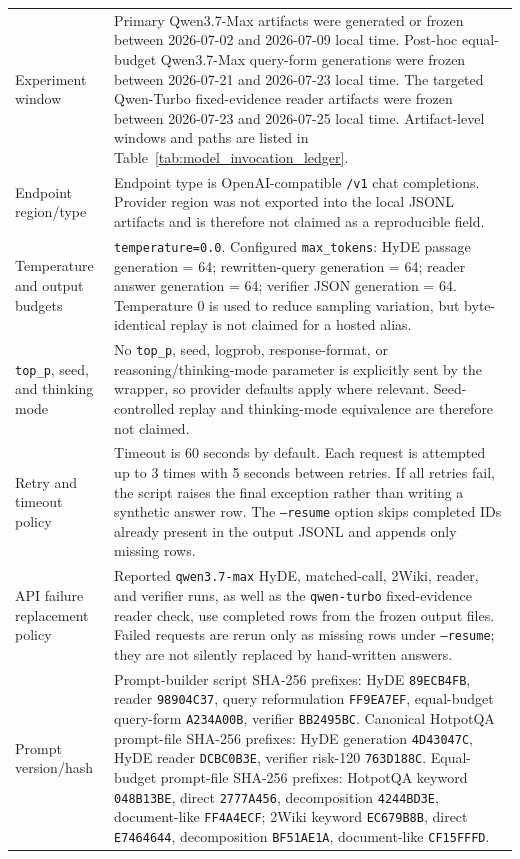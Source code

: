 \begin{longtable}{>{\raggedright\arraybackslash}p{}
                            >{\raggedright\arraybackslash}p{}}
Experiment window & Primary Qwen3.7-Max artifacts were generated or frozen between 2026-07-02 and 2026-07-09 local time. Post-hoc equal-budget Qwen3.7-Max query-form generations were frozen between 2026-07-21 and 2026-07-23 local time. The targeted Qwen-Turbo fixed-evidence reader artifacts were frozen between 2026-07-23 and 2026-07-25 local time. Artifact-level windows and paths are listed in Table~\ref{tab:model_invocation_ledger}. \\
Endpoint region/type & Endpoint type is OpenAI-compatible \texttt{/v1} chat completions. Provider region was not exported into the local JSONL artifacts and is therefore not claimed as a reproducible field. \\
Temperature and output budgets & \texttt{temperature=0.0}. Configured \texttt{max\_tokens}: HyDE passage generation = 64; rewritten-query generation = 64; reader answer generation = 64; verifier JSON generation = 64. Temperature 0 is used to reduce sampling variation, but byte-identical replay is not claimed for a hosted alias. \\
\texttt{top\_p}, seed, and thinking mode & No \texttt{top\_p}, seed, logprob, response-format, or reasoning/thinking-mode parameter is explicitly sent by the wrapper, so provider defaults apply where relevant. Seed-controlled replay and thinking-mode equivalence are therefore not claimed. \\
Retry and timeout policy & Timeout is 60 seconds by default. Each request is attempted up to 3 times with 5 seconds between retries. If all retries fail, the script raises the final exception rather than writing a synthetic answer row. The \texttt{--resume} option skips completed IDs already present in the output JSONL and appends only missing rows. \\
API failure replacement policy & Reported \texttt{qwen3.7-max} HyDE, matched-call, 2Wiki, reader, and verifier runs, as well as the \texttt{qwen-turbo} fixed-evidence reader check, use completed rows from the frozen output files. Failed requests are rerun only as missing rows under \texttt{--resume}; they are not silently replaced by hand-written answers. \\
Prompt version/hash & Prompt-builder script SHA-256 prefixes: HyDE \texttt{89ECB4FB}, reader \texttt{98904C37}, query reformulation \texttt{FF9EA7EF}, equal-budget query-form \texttt{A234A00B}, verifier \texttt{BB2495BC}. Canonical HotpotQA prompt-file SHA-256 prefixes: HyDE generation \texttt{4D43047C}, HyDE reader \texttt{DCBC0B3E}, verifier risk-120 \texttt{763D188C}. Equal-budget prompt-file SHA-256 prefixes: HotpotQA keyword \texttt{048B13BE}, direct \texttt{2777A456}, decomposition \texttt{4244BD3E}, document-like \texttt{FF4A4ECF}; 2Wiki keyword \texttt{EC679B8B}, direct \texttt{E7464644}, decomposition \texttt{BF51AE1A}, document-like \texttt{CF15FFFD}. \\

\end{longtable}
